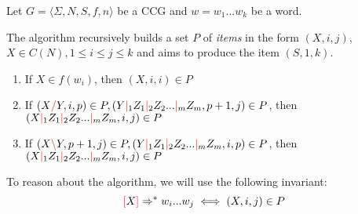 \documentclass[main.tex]{subfiles}
\begin{document}
Let $ G = \langle \Sigma, N, S, f, n \rangle $ be a CCG and $w = w_1 ... w_k$
be a word.

The algorithm recursively builds a set $P$ of \emph{items} in the form
$(X, i, j)$, $X \in C(N), 1 \leq i \leq j \leq k$ and aims to produce the item
$(S, 1, k)$.

\begin{enumerate}
    \item If $X \in f(w_i)$, then $(X, i, i) \in P$
    \item If $(X \textcolor{red}{/} Y, i, p) \in P, (Y \textcolor{red}{|}_1 Z_1 \textcolor{red}{|}_2 Z_2 ... \textcolor{red}{|}_m Z_m, p + 1, j) \in P$,
        then $(X \textcolor{red}{|}_1 Z_1 \textcolor{red}{|}_2 Z_2 ... \textcolor{red}{|}_m Z_m, i, j) \in P$
    \item If $(X \textcolor{red}{\backslash} Y, p + 1, j) \in P, (Y \textcolor{red}{|}_1 Z_1 \textcolor{red}{|}_2 Z_2 ... \textcolor{red}{|}_m Z_m, i, p) \in P$,
        then $(X \textcolor{red}{|}_1 Z_1 \textcolor{red}{|}_2 Z_2 ... \textcolor{red}{|}_m Z_m, i, j) \in P$
\end{enumerate}

To reason about the algorithm, we will use the following invariant:
\begin{equation}
    \textcolor{red}{[} X \textcolor{red}{]} \Rightarrow^* w_i ... w_j \iff (X, i, j) \in P
\end{equation}
\end{document}
